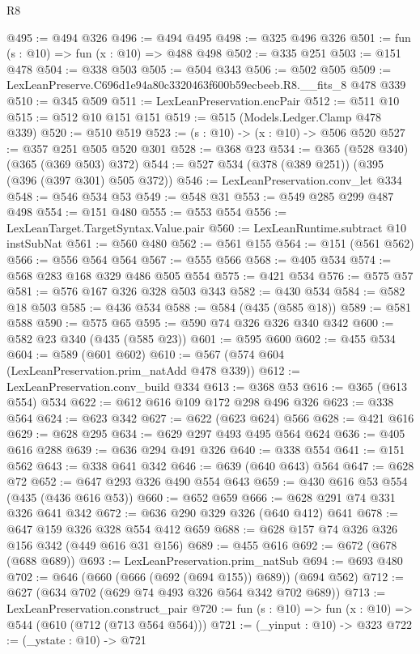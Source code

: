 \begin{lexlean}{R8}
\begin{coremodule}
@495 := @494 @326
@496 := @494 @495
@498 := @325 @496 @326
@501 := fun (s : @10) => fun (x : @10) => @488 @498
@502 := @335 @251
@503 := @151 @478
@504 := @338 @503
@505 := @504 @343
@506 := @502 @505
@509 := LexLeanPreserve.C696d1e94a80c3320463f600b59ecbeeb.R8.__fits_8 @478 @339
@510 := @345 @509
@511 := LexLeanPreservation.encPair
@512 := @511 @10
@515 := @512 @10 @151 @151
@519 := @515 (Models.Ledger.Clamp @478 @339)
@520 := @510 @519
@523 := (s : @10) -> (x : @10) -> @506 @520
@527 := @357 @251 @505 @520 @301
@528 := @368 @23
@534 := @365 (@528 @340) (@365 (@369 @503) @372)
@544 := @527 @534 (@378 (@389 @251)) (@395 (@396 (@397 @301) @505 @372))
@546 := LexLeanPreservation.conv_let @334
@548 := @546 @534 @53
@549 := @548 @31
@553 := @549 @285 @299 @487 @498
@554 := @151 @480
@555 := @553 @554
@556 := LexLeanTarget.TargetSyntax.Value.pair
@560 := LexLeanRuntime.subtract @10 instSubNat
@561 := @560 @480
@562 := @561 @155
@564 := @151 (@561 @562)
@566 := @556 @564 @564
@567 := @555 @566
@568 := @405 @534
@574 := @568 @283 @168 @329 @486 @505 @554
@575 := @421 @534
@576 := @575 @57
@581 := @576 @167 @326 @328 @503 @343
@582 := @430 @534
@584 := @582 @18 @503
@585 := @436 @534
@588 := @584 (@435 (@585 @18))
@589 := @581 @588
@590 := @575 @65
@595 := @590 @74 @326 @326 @340 @342
@600 := @582 @23 @340 (@435 (@585 @23))
@601 := @595 @600
@602 := @455 @534
@604 := @589 (@601 @602)
@610 := @567 (@574 @604 (LexLeanPreservation.prim_natAdd @478 @339))
@612 := LexLeanPreservation.conv_build @334
@613 := @368 @53
@616 := @365 (@613 @554) @534
@622 := @612 @616 @109 @172 @298 @496 @326
@623 := @338 @564
@624 := @623 @342
@627 := @622 (@623 @624) @566
@628 := @421 @616
@629 := @628 @295
@634 := @629 @297 @493 @495 @564 @624
@636 := @405 @616 @288
@639 := @636 @294 @491 @326
@640 := @338 @554
@641 := @151 @562
@643 := @338 @641 @342
@646 := @639 (@640 @643) @564
@647 := @628 @72
@652 := @647 @293 @326 @490 @554 @643
@659 := @430 @616 @53 @554 (@435 (@436 @616 @53))
@660 := @652 @659
@666 := @628 @291 @74 @331 @326 @641 @342
@672 := @636 @290 @329 @326 (@640 @412) @641
@678 := @647 @159 @326 @328 @554 @412 @659
@688 := @628 @157 @74 @326 @326 @156 @342 (@449 @616 @31 @156)
@689 := @455 @616
@692 := @672 (@678 (@688 @689))
@693 := LexLeanPreservation.prim_natSub
@694 := @693 @480
@702 := @646 (@660 (@666 (@692 (@694 @155)) @689)) (@694 @562)
@712 := @627 (@634 @702 (@629 @74 @493 @326 @564 @342 @702 @689))
@713 := LexLeanPreservation.construct_pair
@720 := fun (s : @10) => fun (x : @10) => @544 (@610 (@712 (@713 @564 @564)))
@721 := (_yinput : @10) -> @323
@722 := (_ystate : @10) -> @721

\end{coremodule}
\end{lexlean}
